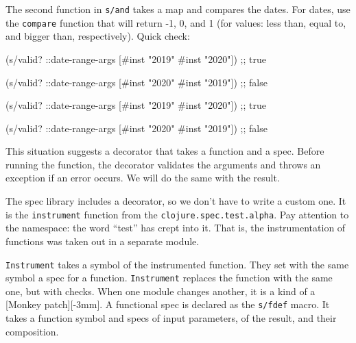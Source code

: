\fi


The second function in \verb|s/and| takes a map and compares the dates. For dates, use the \verb|compare| function that will return -1, 0, and 1 (for values: less than, equal to, and bigger than, respectively). Quick check:

\ifx\DEVICETYPE\MOBILE

\begin{english}
  \begin{clojure}
(s/valid? ::date-range-args
          [#inst "2019" #inst "2020"])
;; true

(s/valid? ::date-range-args
          [#inst "2020" #inst "2019"])
;; false
  \end{clojure}
\end{english}

\else

\begin{english}
  \begin{clojure}
(s/valid? ::date-range-args
          [#inst "2019" #inst "2020"]) ;; true

(s/valid? ::date-range-args
          [#inst "2020" #inst "2019"]) ;; false
  \end{clojure}
\end{english}

\fi


This situation suggests a decorator that takes a function and a spec. Before running the function, the decorator validates the arguments and throws an exception if an error occurs. We will do the same with the result.


The spec library includes a decorator, so we don't have to write a custom one. It is the \verb|instrument| function from the \verb|clojure.spec.test.alpha|. Pay attention to the namespace: the word ``test'' has crept into it. That is, the instrumentation of functions was taken out in a separate module.


\verb|Instrument| takes a symbol of the instrumented function. They set with the same symbol a spec for a function. \verb|Instrument| replaces the function with the same one, but with checks. When one module changes another, it is a kind of a [Monkey patch][-3mm]. A functional spec is declared as the \verb|s/fdef| macro. It takes a function symbol and specs of input parameters, of the result, and their composition.

